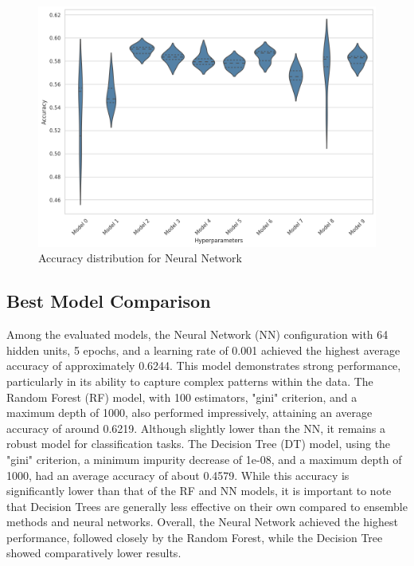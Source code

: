 \begin{figure}[H]
    \centering
    \includegraphics[width=0.99\columnwidth]{images/violin_plot_neural_network.png}
    \caption{Accuracy distribution for Neural Network}
    \label{fig:nn_violin_plot}
\end{figure}



\subsection{Best Model Comparison}

Among the evaluated models, the Neural Network (NN) 
configuration with 64 hidden units, 5 epochs, and a 
learning rate of 0.001 achieved the highest average 
accuracy of approximately 0.6244. 
This model demonstrates strong performance, 
particularly in its ability to capture complex patterns 
within the data. The Random Forest (RF) model, with 100 
estimators, "gini" criterion, and a maximum depth 
of 1000, also performed impressively, attaining an 
average accuracy of around 0.6219. 
Although slightly lower than the NN, it remains a 
robust model for classification tasks. 
The Decision Tree (DT) model, using the "gini" criterion, 
a minimum impurity decrease of 1e-08, and a maximum 
depth of 1000, had an average accuracy of about 0.4579. 
While this accuracy is significantly lower than that 
of the RF and NN models, it is important to note that 
Decision Trees are generally less effective on their 
own compared to ensemble methods and neural networks. 
Overall, the Neural Network achieved the highest 
performance, followed closely by the Random Forest, 
while the Decision Tree showed comparatively lower 
results.

